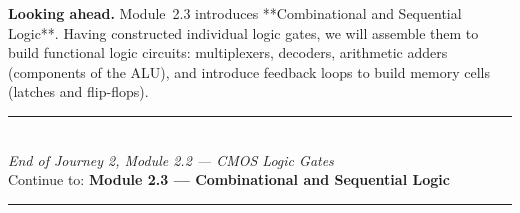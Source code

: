 \documentclass[12pt, a4paper]{book}
\begin{document}
\medskip
\noindent\textbf{Looking ahead.}
Module~2.3 introduces **Combinational and Sequential Logic**. Having constructed individual logic gates, we will assemble them to build functional logic circuits: multiplexers, decoders, arithmetic adders (components of the ALU), and introduce feedback loops to build memory cells (latches and flip-flops).

\vspace{1.4cm}
\begin{center}
{\color{JourneyColor}\rule{0.5\linewidth}{0.8pt}}\\[6pt]
{\small\color{JourneyColor}\textit{End of Journey 2, Module 2.2 --- CMOS Logic Gates}}\\[4pt]
{\small\color{JourneyColor}Continue to: \textbf{Module 2.3 --- Combinational and Sequential Logic}}\\[6pt]
{\color{JourneyColor}\rule{0.5\linewidth}{0.8pt}}
\end{center}
\end{document}
